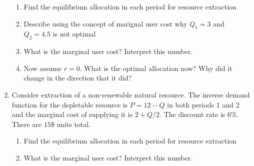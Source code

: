 \documentclass[11pt]{article}
\begin{document}
\begin{enumerate}
  \begin{enumerate}
    \item Find the equilibrium allocation in each period for resource extraction

    \item Describe using the concept of marignal user cost why $Q_1 = 3$ and $Q_2 = 4.5$ is not optimal

    \item What is the marginal user cost? Interpret this number.

    \item Now assume $r = 0$. What is the optimal allocation now? Why did it change in the direction that it did?
  \end{enumerate}

  \item Consider extraction of a non-renewable natural resource. The inverse demand function for the depletable resource is $P = 12 - Q$ in both periods $1$ and $2$ and the marginal cost of supplying it is $2 + Q/2$. The discount rate is $6\%$. There are $15\$$ units total.

  \begin{enumerate}
    \item Find the equilibrium allocation in each period for resource extraction

    \item What is the marginal user cost? Interpret this number.
  \end{enumerate}
\end{enumerate}
\end{document}
